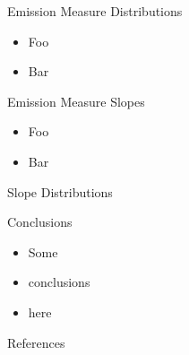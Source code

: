 \documentclass[final]{beamer}
\begin{document}
\begin{frame}
\begin{columns}[T]
\begin{column}{0.49\linewidth}
\begin{block}{Emission Measure Distributions}
\begin{itemize}
      \item Foo
      \item Bar
      \end{itemize}
    \end{block}
    \begin{block}{Emission Measure Slopes}
      \begin{itemize}
      \item Foo
      \item Bar
      \end{itemize}
      \vspace{-1ex}
    \end{block}
    \begin{block}{Slope Distributions}
    \end{block}
    \begin{block}{Conclusions}
      \begin{itemize}
      \item Some
      \item conclusions
      \item here
      \end{itemize}
    \end{block}
    \begin{block}{References}
      \scriptsize
      \vspace{-2ex}
      \begin{multicols}{2}
        
        
      \end{multicols}
    \end{block}
  \end{column}
  \end{columns}
\end{frame}
\end{document}
